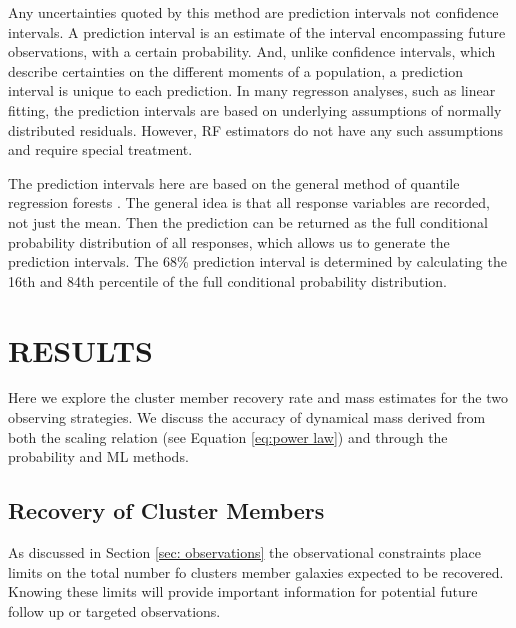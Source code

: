 \documentclass[fleqn,usenatbib]{mnras}
\begin{document}
Any uncertainties quoted by this method are prediction intervals not confidence intervals. A prediction interval is an estimate of the interval encompassing future observations, with a certain probability. And, unlike confidence intervals, which describe certainties on the different moments of a population, a prediction interval is unique to each prediction. In many regresson analyses, such as linear fitting, the prediction intervals are based on underlying assumptions of normally distributed residuals. However, RF estimators do not have any such assumptions and require special treatment.

The prediction intervals here are based on the general method of quantile regression forests \citep{Meinshausen2006}. The general idea is that all response variables are recorded, not just the mean. Then the prediction can be returned as the full conditional probability distribution of all responses, which allows us to generate the prediction intervals. The 68\% prediction interval is determined by calculating the 16th and 84th percentile of the full conditional probability distribution. 

\section{RESULTS}\label{sec:results}
Here we explore the cluster member recovery rate and mass estimates for the two observing strategies. We discuss the accuracy of dynamical mass derived from both the scaling relation (see Equation \ref{eq:power law}) and through the probability and ML methods.

\subsection{Recovery of Cluster Members}
As discussed in Section \ref{sec: observations} the observational constraints place limits on the total number fo clusters member galaxies expected to be recovered. Knowing these limits will provide important information for potential future follow up or targeted observations. 
\end{document}
